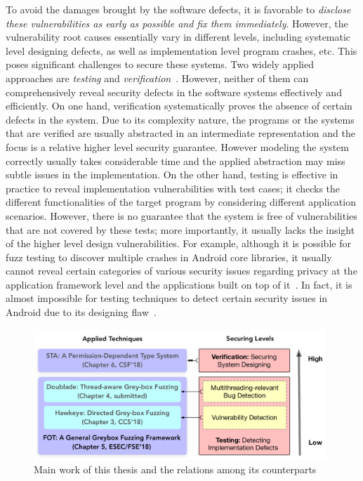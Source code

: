 To avoid the damages brought by the software defects, it is favorable to \emph{disclose these vulnerabilities as early as possible and fix them immediately}. However, the vulnerability root causes essentially vary in different levels, including systematic level designing defects, as well as implementation level program crashes, etc. This poses significant challenges to secure these systems. Two widely applied approaches are \emph{testing} and \emph{verification}~\cite{Hailpern:2002:SDT:1660992.1660994,Felderer:2016:MST:2904681.2904685,mc-at}. However, neither of them can comprehensively reveal security defects in the software systems effectively and efficiently. On one hand, verification systematically proves the absence of certain defects in the system. Due to its complexity nature, the programs or the systems that are verified are usually abstracted in an intermediate representation and the focus is a relative higher level security guarantee. However modeling the system correctly usually takes considerable time and the applied abstraction may miss subtle issues in the implementation. On the other hand, testing is effective in practice to reveal implementation vulnerabilities with test cases; it checks the different functionalities of the target program by considering different application scenarios. However, there is no guarantee that the system is free of vulnerabilities that are not covered by these tests; more importantly, it usually lacks the insight of the higher level design vulnerabilities. For example, although it is possible for fuzz testing to discover multiple crashes in Android core libraries, it usually cannot reveal certain categories of various security issues regarding privacy at the application framework level and the applications built on top of it~\cite{Enck:2009:UAS:1512148.1512324,Ernst:2014}. In fact, it is almost impossible for testing techniques to detect certain security issues in Android due to its designing flaw~\cite{url:android-flaw}.

\begin{figure}[t]
	\begin{center}
		\includegraphics[width=0.98\textwidth]{res/contributions_new}
		\caption{Main work of this thesis and the relations among its counterparts}
		\label{fig:works}
	\end{center}
\end{figure}


